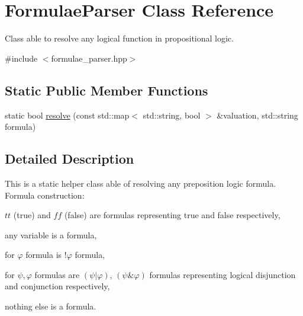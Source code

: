 \hypertarget{classFormulaeParser}{\section{\-Formulae\-Parser \-Class \-Reference}
\label{classFormulaeParser}
}


\-Class able to resolve any logical function in propositional logic.  




{\ttfamily \#include $<$formulae\-\_\-parser.\-hpp$>$}

\subsection*{\-Static \-Public \-Member \-Functions}
\begin{DoxyCompactItemize}
\item 
static bool \hyperlink{classFormulaeParser_a73e95916637a754033419ac3a4b3c07a}{resolve} (const std\-::map$<$ std\-::string, bool $>$ \&valuation, std\-::string formula)
\end{DoxyCompactItemize}


\subsection{\-Detailed \-Description}
\-This is a static helper class able of resolving any preposition logic formula. \-Formula construction\-:
\begin{DoxyEnumerate}
\item $tt$ (true) and $ff$ (false) are formulas representing true and false respectively,
\begin{DoxyEnumerate}
\item any variable is a formula,
\end{DoxyEnumerate}
\item for $\varphi$ formula is $!\varphi$ formula,
\item for $\psi, \varphi$ formulas are $(\psi|\varphi)$, $(\psi\&\varphi)$ formulas representing logical disjunction and conjunction respectively,
\item nothing else is a formula. 
\end{DoxyEnumerate}

